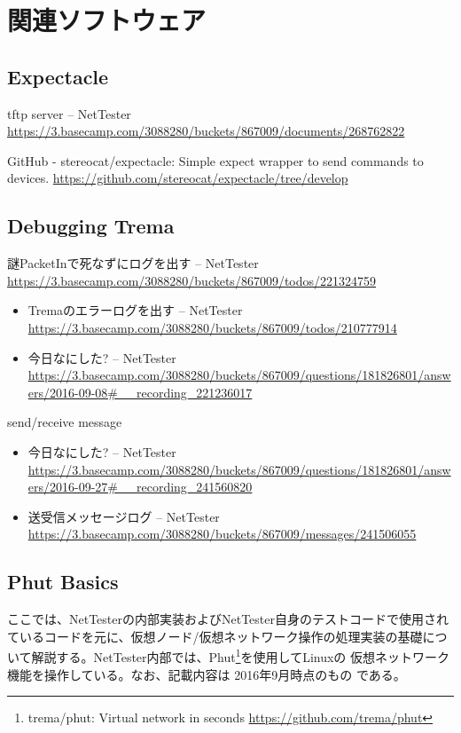 
\chapter{関連ソフトウェア}

 \section{Expectacle}
 \label{sec:expectacle}

tftp server – NetTester \url{https://3.basecamp.com/3088280/buckets/867009/documents/268762822}

GitHub - stereocat/expectacle: Simple expect wrapper to send commands to devices. \url{https://github.com/stereocat/expectacle/tree/develop}

\section{Debugging Trema}

謎PacketInで死なずにログを出す – NetTester \url{https://3.basecamp.com/3088280/buckets/867009/todos/221324759}

\begin{itemize}
 \item Tremaのエラーログを出す – NetTester \url{https://3.basecamp.com/3088280/buckets/867009/todos/210777914}
 \item 今日なにした? – NetTester \url{https://3.basecamp.com/3088280/buckets/867009/questions/181826801/answers/2016-09-08#__recording_221236017}
\end{itemize}

send/receive message

\begin{itemize}
 \item 今日なにした? – NetTester \url{https://3.basecamp.com/3088280/buckets/867009/questions/181826801/answers/2016-09-27#__recording_241560820}
 \item 送受信メッセージログ – NetTester \url{https://3.basecamp.com/3088280/buckets/867009/messages/241506055}
\end{itemize}

\section{Phut Basics}
\label{sec:phut_basics}

ここでは、NetTesterの内部実装およびNetTester自身のテストコードで使用され
ているコードを元に、仮想ノード/仮想ネットワーク操作の処理実装の基礎につ
いて解説する。NetTester内部では、Phut\footnote{trema/phut: Virtual
network in seconds \url{https://github.com/trema/phut}}を使用してLinuxの
仮想ネットワーク機能を操作している。なお、記載内容は 2016年9月時点のもの
である。

